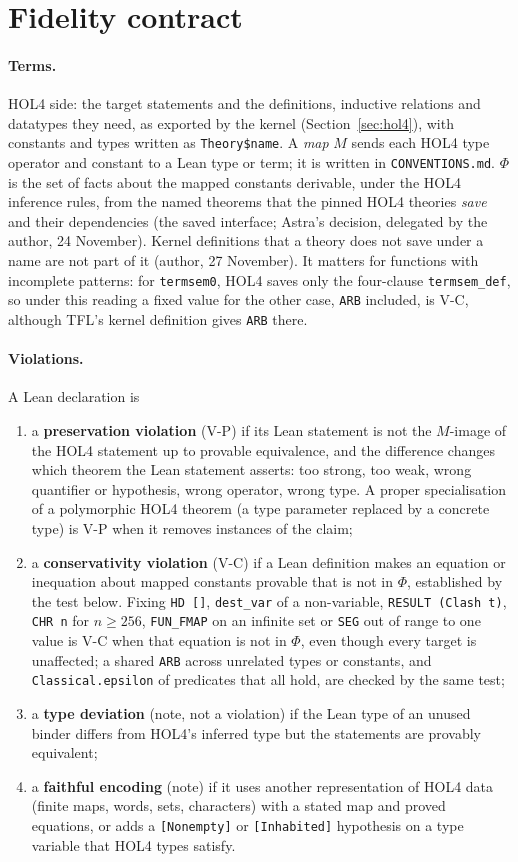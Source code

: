 \documentclass[11pt,a4paper]{article}
\newcommand{\code}[1]{\texttt{#1}}
\begin{document}
\section{Fidelity contract}\label{sec:contract}
\paragraph{Terms.} HOL4 side: the target statements and the definitions, inductive relations and datatypes they need, as exported by the kernel (Section~\ref{sec:hol4}), with constants and types written as \code{Theory\$name}. A \emph{map} $M$ sends each HOL4 type operator and constant to a Lean type or term; it is written in \code{CONVENTIONS.md}. $\Phi$ is the set of facts about the mapped constants derivable, under the HOL4 inference rules, from the named theorems that the pinned HOL4 theories \emph{save} and their dependencies (the saved interface; Astra's decision, delegated by the author, 24 November). Kernel definitions that a theory does not save under a name are not part of it (author, 27 November). It matters for functions with incomplete patterns: for \code{termsem0}, HOL4 saves only the four-clause \code{termsem\_def}, so under this reading a fixed value for the other case, \code{ARB} included, is V-C, although TFL's kernel definition gives \code{ARB} there.
\paragraph{Violations.} A Lean declaration is
\begin{enumerate}
\item a \textbf{preservation violation} (V-P) if its Lean statement is not the $M$-image of the HOL4 statement up to provable equivalence, and the difference changes which theorem the Lean statement asserts: too strong, too weak, wrong quantifier or hypothesis, wrong operator, wrong type. A proper specialisation of a polymorphic HOL4 theorem (a type parameter replaced by a concrete type) is V-P when it removes instances of the claim;
\item a \textbf{conservativity violation} (V-C) if a Lean definition makes an equation or inequation about mapped constants provable that is not in $\Phi$, established by the test below. Fixing \code{HD []}, \code{dest\_var} of a non-variable, \code{RESULT (Clash t)}, \code{CHR n} for $n\ge 256$, \code{FUN\_FMAP} on an infinite set or \code{SEG} out of range to one value is V-C when that equation is not in $\Phi$, even though every target is unaffected; a shared \code{ARB} across unrelated types or constants, and \code{Classical.epsilon} of predicates that all hold, are checked by the same test;
\item a \textbf{type deviation} (note, not a violation) if the Lean type of an unused binder differs from HOL4's inferred type but the statements are provably equivalent;
\item a \textbf{faithful encoding} (note) if it uses another representation of HOL4 data (finite maps, words, sets, characters) with a stated map and proved equations, or adds a \code{[Nonempty]} or \code{[Inhabited]} hypothesis on a type variable that HOL4 types satisfy.
\end{enumerate}
\end{document}
